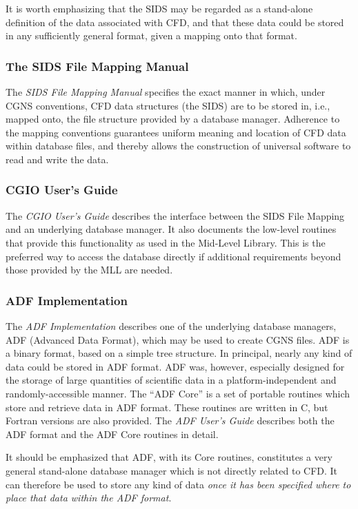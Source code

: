 It is worth emphasizing that the SIDS may be regarded as a stand-alone
definition of the data associated with CFD, and that these data could
be stored in any sufficiently general format, given a mapping onto that
format.

\subsubsection{The SIDS File Mapping Manual}

The \textit{SIDS File Mapping Manual} specifies the exact manner
in which, under CGNS conventions, CFD data structures (the SIDS) are
to be stored in, i.e., mapped onto, the file structure provided by a
database manager.
Adherence to the mapping conventions guarantees uniform meaning
and location of CFD data within database files, and thereby allows the
construction of universal software to read and write the data.

\subsubsection{CGIO User's Guide}

The \textit{CGIO User's Guide} describes the interface between the
SIDS File Mapping and an underlying database manager.
It also documents the low-level routines that provide this
functionality as used in the Mid-Level Library.
This is the preferred way to access the database directly if
additional requirements beyond those provided by the MLL are needed. 

\subsubsection{ADF Implementation}

The \textit{ADF Implementation} describes one of the underlying database
managers, ADF (Advanced Data Format), which may be used to create CGNS
files.
ADF is a binary format, based on a simple tree structure.
In principal, nearly any kind of data could be stored in ADF format.
ADF was, however, especially designed for the storage of large
quantities of scientific data in a platform-independent and
randomly-accessible manner.
The ``ADF Core'' is a set of portable routines which store and retrieve
data in ADF format.
These routines are written in C, but Fortran versions are also provided.
The \textit{ADF User's Guide} describes both the ADF format and the ADF
Core routines in detail.

It should be emphasized that ADF, with its Core routines, constitutes a
very general stand-alone database manager which is not directly related
to CFD. It can therefore be used to store any kind of data \emph{once it has
been specified where to place that data within the ADF format}.

